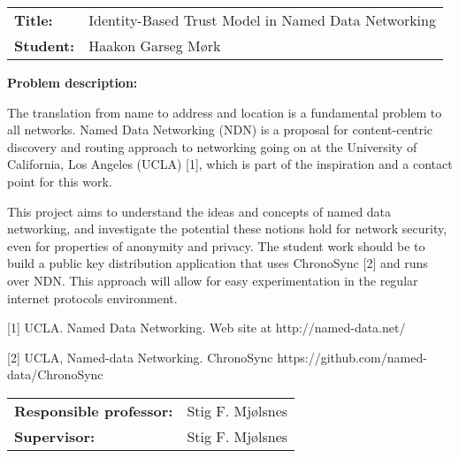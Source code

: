 \begin{titlingpage}

\noindent
\begin{tabular}{@{}p{4cm}l}
\textbf{Title:} 	& Identity-Based Trust Model in Named Data Networking \\
\textbf{Student:}	& Haakon Garseg Mørk \\
\end{tabular}

\vspace{4ex}
\noindent\textbf{Problem description:}
\vspace{2ex}

The translation from name to address and location is a fundamental problem to all networks.
Named Data Networking (NDN) is a proposal for content-centric discovery and routing approach to networking
going on at the University of California, Los Angeles (UCLA) [1], which is part of the inspiration and a contact point for this work.

This project aims to understand the ideas and concepts of named data networking, and investigate the
potential these notions hold for network security, even for properties of anonymity and privacy. 
The student work should be to build a public key distribution application that uses ChronoSync [2] and runs over NDN.
This approach will allow for easy experimentation in the regular internet protocols environment.     

[1]  UCLA.  Named Data Networking. Web site at http://named-data.net/

[2]  UCLA, Named-data Networking. ChronoSync https://github.com/named-data/ChronoSync

\noindent
\begin{tabular}{@{}p{4cm}l}
\textbf{Responsible professor:} 	& Stig F. Mjølsnes \\
\textbf{Supervisor:}			& Stig F. Mjølsnes \\
\end{tabular}

\end{titlingpage}